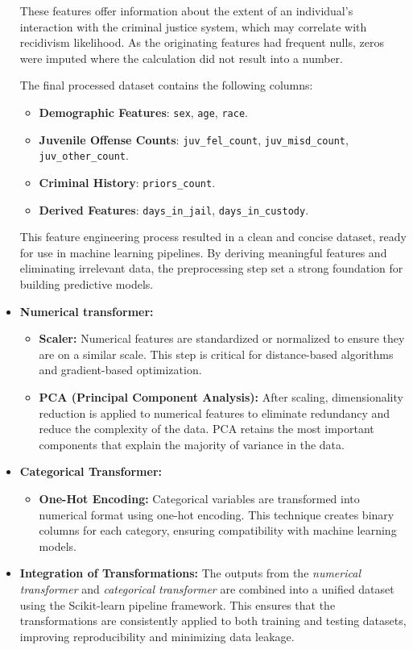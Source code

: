 \begin{itemize}
		These features offer information about the extent of an individual’s interaction with the criminal justice system, which may correlate with recidivism likelihood. As the originating features  had frequent nulls, zeros were imputed where the calculation did not result into a number.
		
		The final processed dataset contains the following columns:
		\begin{itemize}
			\item \textbf{Demographic Features}: \texttt{sex}, \texttt{age}, \texttt{race}.
			\item \textbf{Juvenile Offense Counts}: \texttt{juv\_fel\_count}, \texttt{juv\_misd\_count}, \texttt{juv\_other\_count}.
			\item \textbf{Criminal History}: \texttt{priors\_count}.
			\item \textbf{Derived Features}: \texttt{days\_in\_jail}, \texttt{days\_in\_custody}.
		\end{itemize}
		
		This feature engineering process resulted in a clean and concise dataset, ready for use in machine learning pipelines. By deriving meaningful features and eliminating irrelevant data, the preprocessing step set a strong foundation for building predictive models.
		
		
		\item \textbf{Numerical transformer:}
		\begin{itemize}
			\item \textbf{Scaler:} Numerical features are standardized or normalized to ensure they are on a similar scale. This step is critical for distance-based algorithms and gradient-based optimization.
			\item \textbf{PCA (Principal Component Analysis):} After scaling, dimensionality reduction is applied to numerical features to eliminate redundancy and reduce the complexity of the data. PCA retains the most important components that explain the majority of variance in the data.
		\end{itemize}
		
		\item \textbf{Categorical Transformer:}
		\begin{itemize}
			\item \textbf{One-Hot Encoding:} Categorical variables are transformed into numerical format using one-hot encoding. This technique creates binary columns for each category, ensuring compatibility with machine learning models.
		\end{itemize}
		
		\item \textbf{Integration of Transformations:}
		The outputs from the \textit{numerical transformer} and \textit{categorical transformer} are combined into a unified dataset using the Scikit-learn pipeline framework. This ensures that the transformations are consistently applied to both training and testing datasets, improving reproducibility and minimizing data leakage.
	\end{itemize}
	

